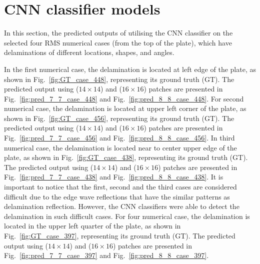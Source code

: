 \section{CNN classifier models}
\label{sec51}

In this section, the predicted outputs of utilising the CNN classifier on the selected four RMS numerical cases (from the top of the plate), which have delaminations of different locations, shapes, and angles.

In the first numerical case, the delamination is located at left edge of the plate, as shown in Fig.~\ref{fig:GT_case_448}, representing its ground truth (GT).
The predicted output using (\(14\times14\)) and (\(16\times16\)) patches are presented in Fig.~\ref{fig:pred_7_7_case_448} and Fig.~\ref{fig:pred_8_8_case_448}.
For second numerical case, the delamination is located at upper left corner of the plate, as shown in Fig.~\ref{fig:GT_case_456}, representing its ground truth (GT).
The predicted output using (\(14\times14\)) and (\(16\times16\)) patches are presented in Fig.~\ref{fig:pred_7_7_case_456} and Fig.~\ref{fig:pred_8_8_case_456}.
In third numerical case, the delamination is located near to center upper edge of the plate, as shown in Fig.~\ref{fig:GT_case_438}, representing its ground truth (GT).
The predicted output using (\(14\times14\)) and (\(16\times16\)) patches are presented in Fig.~\ref{fig:pred_7_7_case_438} and Fig.~\ref{fig:pred_8_8_case_438}.
It is important to notice that the first, second and the third cases are considered difficult due to the edge wave reflections that have the similar patterns as delamination reflection.
However, the CNN classifiers were able to detect the delamination in such difficult cases.
For four numerical case, the delamination is located in the upper left quarter of the plate, as shown in Fig.~\ref{fig:GT_case_397}, representing its ground truth (GT).
The predicted output using (\(14\times14\)) and (\(16\times16\)) patches are presented in Fig.~\ref{fig:pred_7_7_case_397} and Fig.~\ref{fig:pred_8_8_case_397}.

